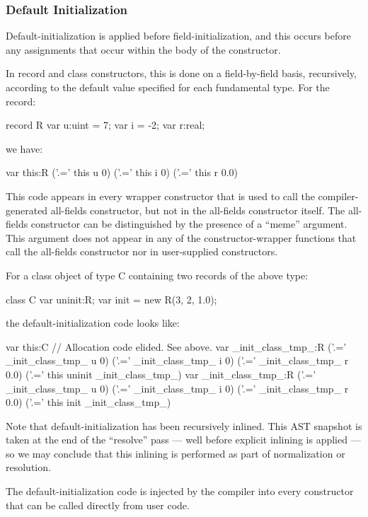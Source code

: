 \subsubsection{Default Initialization}

Default-initialization is applied before field-initialization, and this occurs before any
assignments that occur within the body of the constructor.

In record and class constructors, this is done on a field-by-field basis, recursively,
according to the default value specified for each fundamental type.  For the record:
\begin{chapel}
record R {
  var u:uint = 7;
  var i      = -2;
  var r:real;
}
\end{chapel}
\noindent
we have: 
\begin{numberedchapel}
    var this:R
    ('.=' this u 0)
    ('.=' this i 0)
    ('.=' this r 0.0)
\end{numberedchapel}
\noindent
This code appears in every wrapper constructor that is used to call the compiler-generated
all-fields constructor, but not in the all-fields constructor itself.  The all-fields
constructor can be distinguished by the presence of a ``meme'' argument.  This argument
does not appear in any of the constructor-wrapper functions that call the all-fields
constructor nor in user-supplied constructors.

For a class object of type C containing two records of the above type:
\begin{chapel}
class C {
  var uninit:R;
  var init = new R(3, 2, 1.0);
}
\end{chapel}
\noindent
the default-initialization code looks like:
\begin{numberedchapel}
    var this:C
    // Allocation code elided. See above.
    var _init_class_tmp_:R
    ('.=' _init_class_tmp_ u 0)
    ('.=' _init_class_tmp_ i 0)
    ('.=' _init_class_tmp_ r 0.0)
    ('.=' this uninit _init_class_tmp_)
    var _init_class_tmp_:R
    ('.=' _init_class_tmp_ u 0)
    ('.=' _init_class_tmp_ i 0)
    ('.=' _init_class_tmp_ r 0.0)
    ('.=' this init _init_class_tmp_)
\end{numberedchapel}
\noindent
Note that default-initialization has been recursively inlined.  This AST snapshot
is taken at the end of the ``resolve'' pass --- well before explicit inlining is applied
--- so we may conclude that this inlining is performed as part of normalization or resolution.

The default-initialization code is injected by the compiler into every constructor that can be
called directly from user code.


